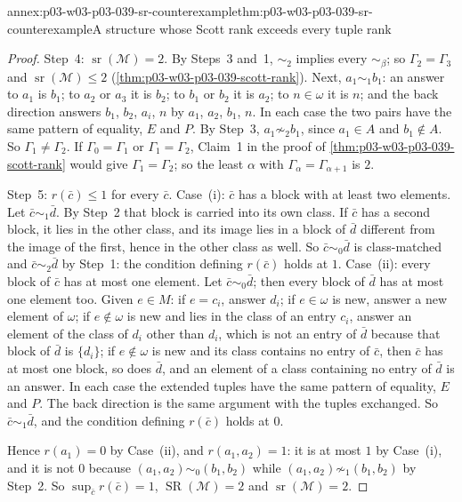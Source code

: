 \begin{annexitem}{annex:p03-w03-p03-039-sr-counterexample}{thm:p03-w03-p03-039-sr-counterexample}{A structure whose Scott rank exceeds every tuple rank}
\begin{proof}
Step~4: \(\operatorname{sr}(\mathcal M)=2\). By Steps~3 and~1, \(\sim_2\)
implies every \(\sim_\beta\); so \(\Gamma_2=\Gamma_3\) and
\(\operatorname{sr}(\mathcal M)\le2\)
(\cref{thm:p03-w03-p03-039-scott-rank}). Next, \(a_1\sim_1b_1\): an answer
to \(a_1\) is \(b_1\); to \(a_2\) or \(a_3\) it is \(b_2\); to \(b_1\) or
\(b_2\) it is \(a_2\); to \(n\in\omega\) it is \(n\); and the back direction
answers \(b_1\), \(b_2\), \(a_i\), \(n\) by \(a_1\), \(a_2\), \(b_1\), \(n\).
In each case the two pairs have the same pattern of equality, \(E\) and
\(P\). By Step~3, \(a_1\not\sim_2b_1\), since \(a_1\in A\) and
\(b_1\notin A\). So \(\Gamma_1\ne\Gamma_2\). If \(\Gamma_0=\Gamma_1\) or
\(\Gamma_1=\Gamma_2\), Claim~1 in the proof of
\cref{thm:p03-w03-p03-039-scott-rank} would give \(\Gamma_1=\Gamma_2\); so
the least \(\alpha\) with \(\Gamma_\alpha=\Gamma_{\alpha+1}\) is \(2\).

Step~5: \(r(\bar c)\le1\) for every \(\bar c\). Case~(i): \(\bar c\) has a
block with at least two elements. Let \(\bar c\sim_1\bar d\). By Step~2
that block is carried into its own class. If \(\bar c\) has a second block,
it lies in the other class, and its image lies in a block of \(\bar d\)
different from the image of the first, hence in the other class as well.
So \(\bar c\sim_0\bar d\) is class-matched and \(\bar c\sim_2\bar d\) by
Step~1: the condition defining \(r(\bar c)\) holds at \(1\). Case~(ii): every
block of \(\bar c\) has at most one element. Let \(\bar c\sim_0\bar d\); then
every block of \(\bar d\) has at most one element too. Given \(e\in M\): if
\(e=c_i\), answer \(d_i\); if \(e\in\omega\) is new, answer a new element of
\(\omega\); if \(e\notin\omega\) is new and lies in the class of an entry
\(c_i\), answer an element of the class of \(d_i\) other than \(d_i\), which
is not an entry of \(\bar d\) because that block of \(\bar d\) is
\(\{d_i\}\); if \(e\notin\omega\) is new and its class contains no entry of
\(\bar c\), then \(\bar c\) has at most one block, so does \(\bar d\), and
an element of a class containing no entry of \(\bar d\) is an answer. In
each case the extended tuples have the same pattern of equality, \(E\) and
\(P\). The back direction is the same argument with the tuples exchanged.
So \(\bar c\sim_1\bar d\), and the condition defining \(r(\bar c)\) holds at
\(0\).

Hence \(r(a_1)=0\) by Case~(ii), and \(r(a_1,a_2)=1\): it is at most \(1\)
by Case~(i), and it is not \(0\) because \((a_1,a_2)\sim_0(b_1,b_2)\) while
\((a_1,a_2)\not\sim_1(b_1,b_2)\) by Step~2. So
\(\sup_{\bar c}r(\bar c)=1\), \(\operatorname{SR}(\mathcal M)=2\) and
\(\operatorname{sr}(\mathcal M)=2\).
\end{proof}
\end{annexitem}

